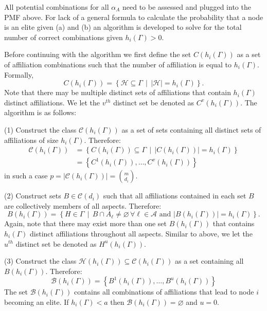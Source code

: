 \begin{subappendices}
All potential combinations for all $\alpha_{A}$ need to be assessed and plugged into the PMF above. For lack of a general formula to calculate the probability that a node is an elite given (a) and (b) an algorithm is developed to solve for the total number of correct combinations given $h_{i}(\Gamma) > 0$.


Before continuing with the algorithm we first define the set $C(h_{i}(\Gamma))$ as a set of affiliation combinations such that the number of affiliation is equal to $h_{i}(\Gamma)$. Formally,
\[
C(h_{i}(\Gamma)) = \left\{ \mathcal{H} \subseteq \Gamma \, \mid \, | \mathcal{H} | = h_{i}(\Gamma) \right\} .
\]
Note that there may be multiple distinct sets of affiliations that contain $h_{i}(\Gamma)$ distinct affiliations. We let the $v^{th}$ distinct set be denoted as $C^{v}(h_{i}(\Gamma))$. The algorithm is as follows:

\begin{abet}
\item[(1)] Construct the class $\mathcal{C}(h_{i}(\Gamma))$ as a set of sets containing all distinct sets of affiliations of size $h_{i}(\Gamma)$. Therefore:
\begin{align*}
\mathcal{C}(h_{i}(\Gamma)) & = \left\{ C(h_{i}(\Gamma)) \subseteq \Gamma \, \mid \, | C(h_{i}(\Gamma)) | = h_{i}(\Gamma) \right\}\\
                   & = \left\{C^{1}(h_{i}(\Gamma)), \ldots, C^{v}(h_{i}(\Gamma))\right\}
\end{align*}
in such a case $p = | \mathcal{C}(h_{i}(\Gamma)) | = \binom{m}{d_{i}}$.

\item[(2)] Construct sets $B \in \mathcal{C}(d_{i})$ such that all affiliations contained in each set $B$ are collectively members of all aspects. Therefore:
\[
B(h_{i}(\Gamma)) = \left\{ H \in \Gamma \, \mid \, B \cap A_{\ell} \neq \varnothing \, \forall \ell \in \mathcal{A} \mbox{ and } | B (h_{i}(\Gamma)) | = h_{i}(\Gamma) \right\} .
\]
Again, note that there may exist more than one set $B(h_{i}(\Gamma))$ that contains $h_{i}(\Gamma)$ distinct affiliations throughout all aspects. Similar to above, we let the $u^{th}$ distinct set be denoted as $H^{u}(h_{i}(\Gamma))$.

\item[(3)] Construct the class $\mathcal{H}(h_{i}(\Gamma)) \subseteq \mathcal{C}(h_{i}(\Gamma))$ as a set containing all $B(h_{i}(\Gamma))$. Therefore:
\[
\mathcal{B}(h_{i}(\Gamma)) = \left\{ B^{1}(h_{i}(\Gamma)), \ldots, B^{u}(h_{i}(\Gamma)) \right\}
\]
The set $\mathcal{B}(h_{i}(\Gamma))$ contains all combinations of affiliations that lead to node $i$ becoming an elite. If $h_{i}(\Gamma) < a$ then $\mathcal{B}(h_{i}(\Gamma)) = \varnothing$ and $u = 0$.


\end{abet}
\end{subappendices}
